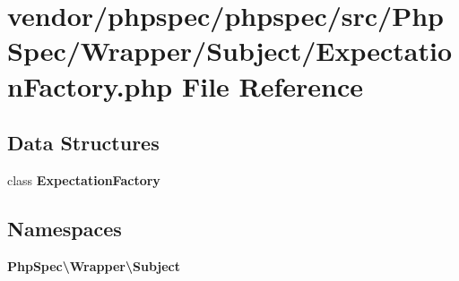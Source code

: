 \section{vendor/phpspec/phpspec/src/\+Php\+Spec/\+Wrapper/\+Subject/\+Expectation\+Factory.php File Reference}
\label{_expectation_factory_8php}
\subsection*{Data Structures}
\begin{DoxyCompactItemize}
\item 
class {\bf Expectation\+Factory}
\end{DoxyCompactItemize}
\subsection*{Namespaces}
\begin{DoxyCompactItemize}
\item 
 {\bf Php\+Spec\textbackslash{}\+Wrapper\textbackslash{}\+Subject}
\end{DoxyCompactItemize}
